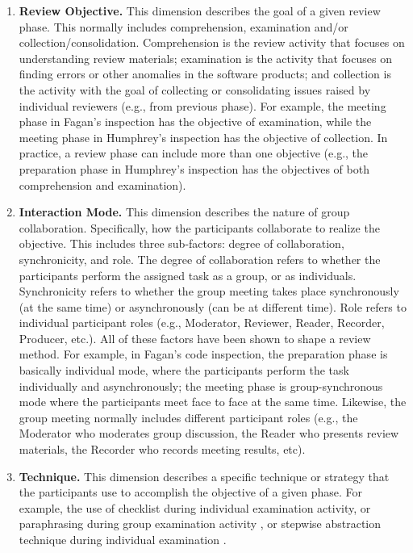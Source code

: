 \begin{enumerate}
\item {\bf Review Objective.} This dimension describes the goal
of a given review phase. This normally includes comprehension,
examination and/or collection/consolidation. Comprehension is the
review activity that focuses on understanding review materials;
examination is the activity that focuses on finding errors or other
anomalies in the software products; and collection is the activity
with the goal of collecting or consolidating issues
raised by individual reviewers (e.g., from previous phase). 
For example, the meeting phase in Fagan's
inspection \cite{Fagan76} has the objective of examination, while the
meeting phase in Humphrey's inspection \cite{Humphrey90} has the
objective of collection. 
In practice, a review phase can include more than one objective (e.g.,
the preparation phase in Humphrey's inspection has the
objectives of both comprehension and examination).

\item {\bf Interaction Mode.} This dimension describes the nature of
group collaboration. Specifically, how the
participants collaborate to realize the objective. This includes three
sub-factors: degree of collaboration, synchronicity, and
role. The degree  of collaboration refers to whether the participants
perform the assigned task as a group, or as  individuals.
Synchronicity refers to whether the group meeting takes place
synchronously (at the same time) or asynchronously (can be at
different time). Role refers to 
individual participant roles (e.g., Moderator, Reviewer, Reader,
Recorder, Producer, etc.). 
All of these factors have been shown to shape a review method.
For example, in Fagan's code inspection, the preparation phase is
basically individual mode, where the participants perform the task
individually and asynchronously; the meeting phase is
group-synchronous mode where the participants meet face to face at the
same time.
Likewise, the group meeting normally includes different participant
roles (e.g., the Moderator who moderates group discussion, the
Reader who presents 
review materials, the Recorder who records meeting results, etc).


\item {\bf Technique.}
This dimension describes a specific technique or strategy that the
participants use to accomplish the objective of a given phase.
For example, the use of checklist during individual examination
activity, or paraphrasing during group examination activity
\cite{Fagan76}, or stepwise abstraction technique during individual
examination \cite{Basili85}.

\end{enumerate}

